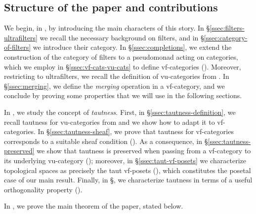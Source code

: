 \subsection*{Structure of the paper and contributions}
We begin, in , by introducing the main characters of this story. In \S\ref{ssec:filters-ultrafilters} we recall the necessary background on filters, and in \S\ref{ssec:category-of-filters} we introduce their category. In \S\ref{ssec:completions}, we extend the construction of the category of filters to a pseudomonad acting on categories, which we employ in \S\ref{ssec:vf-cats-vu-cats} to define vf-categories (). Moreover, restricting to ultrafilters, we recall the definition of vu-categories from \cite{saadiaExtendingConceptualCompleteness2026,hamadGeneralisedUltracategoriesConceptual2025,vangoolToposesEnoughPoints2026}. In \S\ref{ssec:merging}, we define the \emph{merging} operation in a vf-category, and we conclude by proving some properties that we will use in the following sections.

In , we study the concept of \emph{tautness}. First, in \S\ref{ssec:tautness-definition}, we recall tautness for vu-categories from \cite{saadiaGeometricMorphismsVirtual2026} and we show how to adapt it to vf-categories. In \S\ref{ssec:tautness-sheaf}, we prove that tautness for vf-categories corresponds to a suitable sheaf condition (). As a consequence, in \S\ref{ssec:tautness-preserved} we show that tautness is preserved when passing from a vf-category to its underlying vu-category (); moreover, in \S\ref{ssec:taut-vf-posets} we characterize topological spaces as precisely the taut vf-posets (), which constitutes the posetal case of our main result. Finally, in \S{}, we characterize tautness in terms of a useful orthogonality property ().

In , we prove the main theorem of the paper, stated below.


